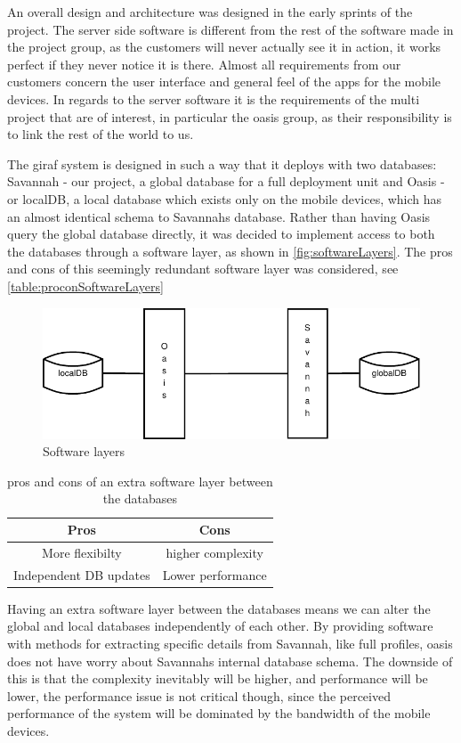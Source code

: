 An overall design and architecture was designed in the early sprints of the project.
The server side software is different from the rest of the software made in the project group, as the customers will never actually see it in action, it works perfect if they never notice it is there.
Almost all requirements from our customers concern the user interface and general feel of the apps for the mobile devices. In regards to the server software it is the requirements of the multi project that are of interest,
in particular the oasis group, as their responsibility is to link the rest of the world to us.

The giraf system is designed in such a way that it deploys with two databases: Savannah - our project, a global database for a full deployment unit and Oasis - or localDB, a local database which exists only
on the mobile devices, which has an almost identical schema to Savannahs database.
Rather than having Oasis query the global database directly, it was decided to implement access to both the databases through a software layer, as shown in \autoref{fig:softwareLayers}.
The pros and cons of this seemingly redundant software layer was considered, see \autoref{table:proconSoftwareLayers}

\begin{figure}[H]
	\centering
		\includegraphics[scale=1]{images/softwareLayers}
	\caption{Software layers}
	\label{fig:softwareLayers}
\end{figure}

\begin{table}[H]
  \begin{center}
    \begin{tabular}{c|c}
    Pros                   &             Cons \\
    \hline
    More flexibilty        & higher complexity\\
    Independent DB updates & Lower performance\\
    \end{tabular}
    \caption{pros and cons of an extra software layer between the databases}
    \label{table:proconSoftwareLayers}
  \end{center}
\end{table}

Having an extra software layer between the databases means we can alter the global and local databases independently of each other. By providing software with methods for extracting specific
details from Savannah, like full profiles, oasis does not have worry about Savannahs internal database schema. The downside of this is that the complexity inevitably will be higher, and performance
will be lower, the performance issue is not critical though, since the perceived performance of the system will be dominated by the bandwidth of the mobile devices.  

